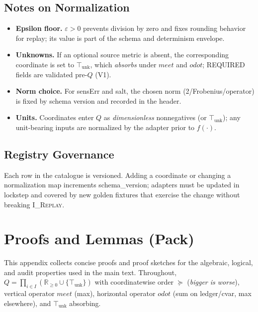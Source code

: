 \documentclass[11pt]{article}
\theoremstyle{plain}
\theoremstyle{definition}
\theoremstyle{remark}
\newcommand{\RR}{\mathbb{R}}
\def\Q{Q}%
\def\vmeet{meet}%
\def\hplus{odot}%
\def\code#1{#1}%
\DeclareRobustCommand{\Q}{\texorpdfstring{\ensuremath{\mathcal{Q}}}{Q}}     %
\newcommand{\unk}{\top_{\mathrm{unk}}}         %
\newcommand{\vmeet}{\wedge}                    %
\newcommand{\hplus}{\odot}                     %
\newcommand{\geqQ}{\succeq}
\newcommand{\code}[1]{\texttt{\textup{#1}}}    %
\newcommand{\sensErr}{\code{sensErr}}
\newcommand{\ledger}{\code{ledger}}
\newcommand{\cvar}{\code{cvar}}
\newcommand{\IReplay}{\textsc{I\_Replay}}
\def\Q{Q}%
\def\vmeet{meet}%
\def\hplus{odot}%
\def\code#1{#1}%
\begin{document}
\subsection*{Notes on Normalization}
\begin{itemize}[leftmargin=1.6em]
  \item \textbf{Epsilon floor.} $\varepsilon>0$ prevents division by zero and fixes rounding behavior for replay; its value is part of the schema and determinism envelope.
  \item \textbf{Unknowns.} If an optional source metric is absent, the corresponding coordinate is set to $\unk$, which \emph{absorbs} under $\vmeet$ and $\hplus$; REQUIRED fields are validated pre-$\Q$ (V1).
  \item \textbf{Norm choice.} For \sensErr{} and \code{salt}, the chosen norm (2/Frobenius/operator) is fixed by schema version and recorded in the header.
  \item \textbf{Units.} Coordinates enter $\Q$ as \emph{dimensionless} nonnegatives (or $\unk$); any unit-bearing inputs are normalized by the adapter prior to $f(\cdot)$.
\end{itemize}

\subsection*{Registry Governance}
Each row in the catalogue is versioned. Adding a coordinate or changing a normalization map increments \code{schema\_version}; adapters must be updated in lockstep and covered by new golden fixtures that exercise the change without breaking \IReplay.


\section{Proofs and Lemmas (Pack)}
\label{app:proofs}

This appendix collects concise proofs and proof sketches for the algebraic, logical, and audit properties used in the main text. Throughout, $\Q=\prod_{i\in I}(\RR_{\ge 0}\cup\{\unk\})$ with coordinatewise order $\geqQ$ (\emph{bigger is worse}), vertical operator $\vmeet$ (max), horizontal operator $\hplus$ (sum on \ledger/\cvar, max elsewhere), and $\unk$ absorbing.
\end{document}
